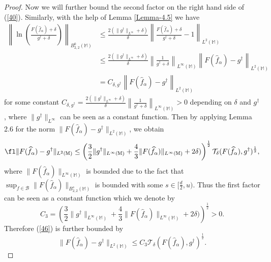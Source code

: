 \documentclass[10pt]{iopart}
\begin{document}
\begin{proof}
Now we will further bound the second factor on the right hand side of (\ref{40}). Similarly, with the help of
Lemma \ref{Lemma-4.5} we have
\begin{align}\label{45}
 \left\|\ln\left(\frac{F(\widehat{f}_{\alpha})+\delta}{g^{\dagger}+\delta}\right)\right\|_{B_{2,2}^{0}(\mathbb{M})} &\leq 
 \frac{2(\|g^{\dagger}\|_{L^{\infty}}+\delta)}{\delta}\left\|\frac{F(\widehat{f}_{\alpha})+\delta}{g^{\dagger}+\delta}-1\right\|_{L^{2}(\mathbb{M})}\nonumber\\
 &\leq  \frac{2(\|g^{\dagger}\|_{L^{\infty}}+\delta)}{\delta}\left\|\frac{1}{g^{\dagger}+\delta}\right\|_{L^{\infty}(\mathbb{M})}\left\|F(\widehat{f}_{\alpha})-g^{\dagger}\right\|_{L^{2}(\mathbb{M})}\nonumber\\
 &=C_{\delta, g^{\dagger}} \left\|F(\widehat{f}_{\alpha})-g^{\dagger}\right\|_{L^{2}(\mathbb{M})}
  \end{align}
 for some constant $C_{\delta, g^{\dagger}}=\frac{2(\|g^{\dagger}\|_{L^{\infty}}+\delta)}{\delta}\left\|\frac{1}{g^{\dagger}+\delta}\right\|_{L^{\infty}(\mathbb{M})}>0$ depending on $\delta$ and $g^{\dagger}$, 
where $\|g^{\dagger}\|_{L^{\infty}}$ can be seen as a constant function. Then by applying Lemma 2.6 \cite{Hohage2016} for the norm $\|F(\widehat{f}_{\alpha})-g^{\dagger}\|_{L^{2}(\mathbb{M})}$, we obtain
\begin{align}\label{46}
\fl \|F(\widehat{f}_{\alpha})-g^{\dagger}\|_{L^{2}(\mathbb{M})}\leq \left(\frac{3}{2}\|g^{\dagger}\|_{L^{\infty}(\mathbb{M})}
+\frac{4}{3}\|F(\widehat{f}_{\alpha})\|_{L^{\infty}(\mathbb{M})}+2\delta)\right)^{\frac{1}{2}}\mathcal{T}_{\delta}
(F(\widehat{f}_{\alpha}), g^{\dagger})^{\frac{1}{2}},
\end{align}
where $\|F(\widehat{f}_{\alpha})\|_{L^{\infty}(\mathbb{M})}$ is bounded due to the fact that $\sup_{f\in\mathcal{B}}
\|F(\widehat{f}_{\alpha})\|_{B_{2,2}^{s}(\mathbb{M})}$ is bounded with some $s\in[\frac{d}{2}, u)$. Thus the first factor can be seen as
a constant function which we denote by
\begin{equation*}
C_{3}=\left(\frac{3}{2}\|g^{\dagger}\|_{L^{\infty}(\mathbb{M})}
+\frac{4}{3}\|F(\widehat{f}_{\alpha})\|_{L^{\infty}(\mathbb{M})}+2\delta)\right)^{\frac{1}{2}}>0.
\end{equation*}
Therefore (\ref{46}) is further bounded by
\begin{equation}\label{47}
\|F(\widehat{f}_{\alpha})-g^{\dagger}\|_{L^{2}(\mathbb{M})}\leq C_{3}\mathcal{T}_{\delta}(F(\widehat{f}_{\alpha}), g^{\dagger})^{\frac{1}{2}}.
\end{equation}

\end{proof}
\end{document}
